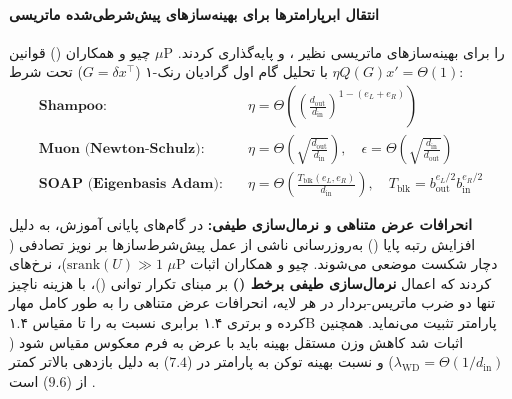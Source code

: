 \paragraph*{انتقال ابرپارامترها برای بهینه‌سازهای پیش‌شرطی‌شده ماتریسی}
چیو و همکاران () \cite{qiu2026matrix} قوانین $\mu$P را برای بهینه‌سازهای ماتریسی نظیر  \cite{gupta2018shampoo}،  \cite{vyas2024soap} و  \cite{jordan2024muon} پایه‌گذاری کردند. با تحلیل گام اول گرادیان رنک-۱ ($G = \delta x^\top$) تحت شرط $\eta Q(G) x' = \Theta(1)$:
\begin{align}
    \textbf{Shampoo:} \quad & \eta = \Theta\left(\left(\frac{d_{\text{out}}}{d_{\text{in}}}\right)^{1 - (e_L + e_R)}\right) \\
    \textbf{Muon (Newton-Schulz):} \quad & \eta = \Theta\left(\sqrt{\frac{d_{\text{out}}}{d_{\text{in}}}}\right), \quad \epsilon = \Theta\left(\sqrt{\frac{d_{\text{in}}}{d_{\text{out}}}}\right) \\
    \textbf{SOAP (Eigenbasis Adam):} \quad & \eta = \Theta\left(\frac{T_{\text{blk}}(e_L, e_R)}{d_{\text{in}}}\right), \quad T_{\text{blk}} = b_{\text{out}}^{e_L/2} b_{\text{in}}^{e_R/2}
\end{align}

\noindent
\textbf{انحرافات عرض متناهی و نرمال‌سازی طیفی:} در گام‌های پایانی آموزش، به دلیل افزایش رتبه پایا () به‌روزرسانی ناشی از عمل پیش‌شرط‌سازها بر نویز تصادفی ($\text{srank}(U) \gg 1$)، نرخ‌های $\mu$P دچار شکست موضعی می‌شوند. چیو و همکاران اثبات کردند که اعمال \textbf{نرمال‌سازی طیفی برخط ()} بر مبنای تکرار توانی ()، با هزینه ناچیز تنها دو ضرب ماتریس-بردار در هر لایه، انحرافات عرض متناهی را به طور کامل مهار کرده و برتری ۱.۴ برابری  نسبت به  را تا مقیاس ۱.۴B پارامتر تثبیت می‌نماید. همچنین اثبات شد کاهش وزن مستقل بهینه باید با عرض به فرم معکوس مقیاس شود ($\lambda_{\text{WD}} = \Theta(1/d_{\text{in}})$) و نسبت بهینه توکن به پارامتر در  ($7.4$) به دلیل بازدهی بالاتر کمتر از  ($9.6$) است \cite{qiu2026matrix}.

